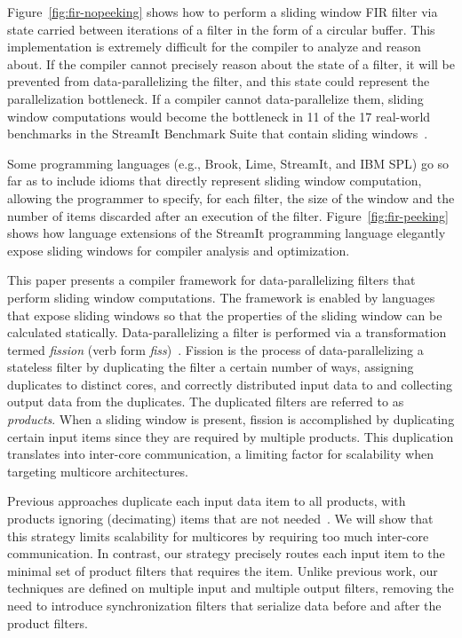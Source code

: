 Figure~\ref{fig:fir-nopeeking} shows how to perform a sliding window
FIR filter via state carried between iterations of a filter in the
form of a circular buffer.  This implementation is extremely difficult
for the compiler to analyze and reason about.  If the compiler cannot
precisely reason about the state of a filter, it will be prevented
from data-parallelizing the filter, and this state could represent the
parallelization bottleneck.  If a compiler cannot data-parallelize them,
sliding window computations would become the bottleneck in 11 of the
17 real-world benchmarks in the StreamIt Benchmark Suite that contain
sliding windows~\cite{streamit-suite}.

 Some programming languages (e.g., Brook, Lime,
StreamIt, and IBM SPL) go so far as to include idioms that directly
represent sliding window computation, allowing the programmer to
specify, for each filter, the size of the window and the number of
items discarded after an execution of the filter.
Figure~\ref{fig:fir-peeking} shows how language extensions of the
StreamIt programming language elegantly expose sliding windows for
compiler analysis and optimization.

This paper presents a compiler framework for data-parallelizing
filters that perform sliding window computations.  The framework is
enabled by languages that expose sliding windows so that the
properties of the sliding window can be calculated statically.
Data-parallelizing a filter is performed via a transformation termed
{\it fission} (verb form {\it fiss})~\cite{streamit-asplos}.  Fission
is the process of data-parallelizing a stateless filter by duplicating
the filter a certain number of ways, assigning duplicates to distinct
cores, and correctly distributed input data to and collecting output
data from the duplicates.  The duplicated filters are referred to as
{\it products}.  When a sliding window is present, fission is
accomplished by duplicating certain input items since they are
required by multiple products.  This duplication translates into
inter-core communication, a limiting factor for scalability when
targeting multicore architectures.

Previous approaches duplicate each input data item to all products,
with products ignoring (decimating) items that are not
needed~\cite{streamit-asplos}.  We will show that this strategy limits
scalability for multicores by requiring too much inter-core
communication.  In contrast, our strategy precisely routes each input
item to the minimal set of product filters that requires the item.
Unlike previous work, our techniques are defined on
multiple input and multiple output filters, removing the need to
introduce synchronization filters that serialize data before and
after the product filters.  


